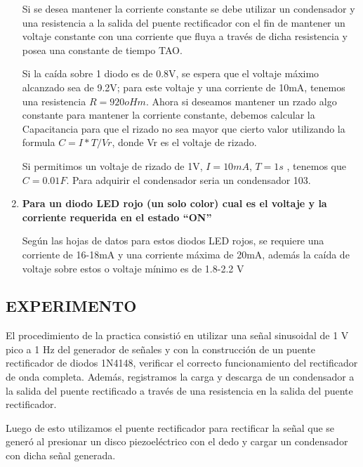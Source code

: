 \documentclass[journal,transmag]{IEEEtran}
\begin{document}
\begin{enumerate}[]
Si se desea mantener la corriente constante se debe utilizar un condensador y una resistencia a la salida del puente rectificador con el fin de mantener un voltaje constante con una corriente que fluya a través de dicha resistencia y posea una constante de tiempo  TAO.  

Si la caída sobre 1 diodo es de 0.8V, se espera que el voltaje máximo alcanzado sea de 9.2V; para este voltaje y una corriente de 10mA, tenemos una resistencia $R=920 oHm $.   Ahora si deseamos mantener un rzado algo constante para mantener la corriente constante, debemos calcular la Capacitancia para que el rizado no sea mayor que cierto valor utilizando la formula $C = I * T / Vr$, donde Vr es el voltaje de rizado. 

Si permitimos un voltaje de rizado de 1V, $I=10mA$, $T=1s$ , tenemos que $C=0.01F$.  Para adquirir el condensador seria un condensador 103. 

\item \textbf{Para un diodo LED rojo (un solo color) cual es el voltaje y la corriente requerida en el estado “ON” }

Según las hojas de datos para estos diodos LED rojos, se requiere una corriente de 16-18mA y una corriente máxima de 20mA, además la caída de voltaje sobre estos o voltaje mínimo es de 1.8-2.2 V  
\end{enumerate}

\subsection{EXPERIMENTO}
    
El procedimiento de la practica consistió en utilizar una señal sinusoidal de 1 V pico a 1 Hz del generador de señales y con la construcción de un puente rectificador de diodos 1N4148, verificar el correcto funcionamiento del rectificador de onda completa.  Además, registramos la carga y descarga de un condensador a la salida del puente rectificado a través de una resistencia en la salida del puente rectificador.  

Luego de esto utilizamos el puente rectificador para rectificar la señal que se generó al presionar un disco piezoeléctrico con el dedo y cargar un condensador con dicha señal generada. 
\end{document}
